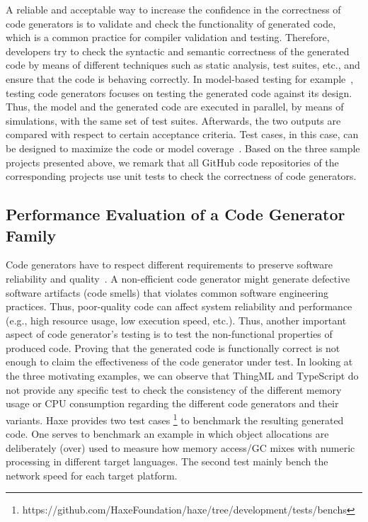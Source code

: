 A reliable and acceptable way to increase the confidence in the correctness of code generators is to validate and check the functionality of generated code, which is a common practice for compiler validation and testing.
Therefore, developers try to check the syntactic and semantic correctness of the generated code by means of different techniques such as static analysis, test suites, etc., and ensure that the code is behaving correctly.  In model-based testing for example~\cite{jorges2014back,stuermer2007systematic}, testing code generators focuses on testing the generated code against its design. Thus, the model and the generated code are executed in parallel, by means of simulations, with the same set of test suites. Afterwards, the two outputs are compared with respect to certain acceptance criteria. Test cases, in this case, can be designed to maximize the code or model coverage~\cite{sturmer2005overview}. 
Based on the three sample projects presented above, we remark that all GitHub code repositories of the corresponding projects use unit tests to check the correctness of code generators.  

\subsection{Performance Evaluation of a Code Generator Family}


Code generators have to respect different requirements to preserve software reliability and quality~\cite{demertzi2011analyzing}. A non-efficient code generator might generate defective software artifacts (code smells) that violates common software engineering practices. Thus, poor-quality code can affect system reliability and performance (e.g., high resource usage, low execution speed, etc.). Thus, another important aspect of code generator's testing is to test the non-functional properties of produced code. Proving that the generated code is functionally correct is not enough to claim the effectiveness of the code generator under test. In looking at the three motivating examples, we can observe that ThingML and TypeScript do not provide any specific test to check the consistency of the different memory usage or CPU consumption regarding the different code generators and their variants. Haxe provides two test cases \footnote{https://github.com/HaxeFoundation/haxe/tree/development/tests/benchs} to benchmark the resulting generated code. One serves to benchmark an example in which object allocations are deliberately (over) used to measure how memory access/GC mixes with numeric processing in different target languages. The second test mainly bench the network speed for each target platform. 

